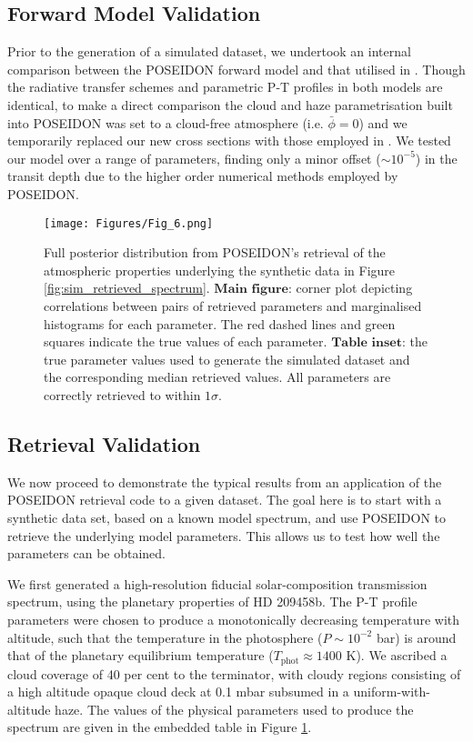 \documentclass[fleqn,usenatbib]{mnras}
\begin{document}
\subsection{Forward Model Validation}\label{subsection:forward_model_validation}

Prior to the generation of a simulated dataset, we undertook an internal comparison between the POSEIDON forward model and that utilised in \citet{Madhusudhan2014c}. Though the radiative transfer schemes and parametric P-T profiles in both models are identical, to make a direct comparison the cloud and haze parametrisation built into POSEIDON was set to a cloud-free atmosphere (i.e. $\bar{\phi}=0$) and we temporarily replaced our new cross sections with those employed in \citet{Madhusudhan2014c}. We tested our model over a range of parameters, finding only a minor offset ($\sim 10^{-5}$) in the transit depth due to the higher order numerical methods employed by POSEIDON.

\begin{figure*}
	\texttt{[image: Figures/Fig\_6.png]}
    \caption{Full posterior distribution from POSEIDON's retrieval of the atmospheric properties underlying the synthetic data in Figure \ref{fig:sim_retrieved_spectrum}. $\textbf{Main figure:}$ corner plot depicting correlations between pairs of retrieved parameters and marginalised histograms for each parameter. The red dashed lines and green squares indicate the true values of each parameter. $\textbf{Table inset:}$ the true parameter values used to generate the simulated dataset and the corresponding median retrieved values. All parameters are correctly retrieved to within $1\sigma$.}
    \label{fig:sim_posterior}
\end{figure*}

\subsection{Retrieval Validation}\label{subsection:retrieval_validation}

We now proceed to demonstrate the typical results from an application of the POSEIDON retrieval code to a given dataset. The goal here is to start with a synthetic data set, based on a known model spectrum, and use POSEIDON to retrieve the underlying model parameters. This allows us to test how well the parameters can be obtained. 

We first generated a high-resolution fiducial solar-composition transmission spectrum, using the planetary properties of HD 209458b. The P-T profile parameters were chosen to produce a monotonically decreasing temperature with altitude, such that the temperature in the photosphere ($P \sim 10^{-2}$ bar) is around that of the planetary equilibrium temperature ($T_{\mathrm{phot}} \approx 1400$ K). We ascribed a cloud coverage of 40 per cent to the terminator, with cloudy regions consisting of a high altitude opaque cloud deck at 0.1 mbar subsumed in a uniform-with-altitude haze. The values of the physical parameters used to produce the spectrum are given in the embedded table in Figure \ref{fig:sim_posterior}. 
\end{document}

